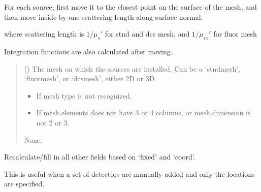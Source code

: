 \documentclass[letterpaper,10pt,english]{sphinxmanual}
\begin{document}
\begin{fulllineitems}
\begin{fulllineitems}
\sphinxAtStartPar
For each source, first move it to the closest point on the surface of the mesh, and then move inside by one scattering length along surface normal.

\sphinxAtStartPar
where scattering length is \(1/\mu_s'\) for stnd and dcs mesh, and \(1/\mu_{sx}'\) for fluor mesh

\sphinxAtStartPar
Integration functions are also calculated after moving.
\begin{quote}\begin{description}
\sphinxAtStartPar
{} () \textendash{} The mesh on which the sources are installed. Can be a ‘stndmesh’, ‘fluormesh’, or ‘dcsmesh’, either 2D or 3D

\begin{itemize}
\item {} 
\sphinxAtStartPar
{} \textendash{} If mesh type is not recognized.

\item {} 
\sphinxAtStartPar
{} \textendash{} If mesh.elements does not have 3 or 4 columns, or mesh.dimension is not 2 or 3.

\end{itemize}

\sphinxAtStartPar
None.

\end{description}\end{quote}

\end{fulllineitems}


\begin{fulllineitems}
\label{\detokenize{_autosummary/nirfasterff.base.optodes.optode:nirfasterff.base.optodes.optode.touch_detectors}}
\pysigstartsignatures
\pysiglinewithargsret
{}
{}
{}
\pysigstopsignatures
\sphinxAtStartPar
Recalculate/fill in all other fields based on ‘fixed’ and ‘coord’.

\sphinxAtStartPar
This is useful when a set of detectors are manually added and only the locations are specified.


\end{fulllineitems}
\end{fulllineitems}
\end{document}

